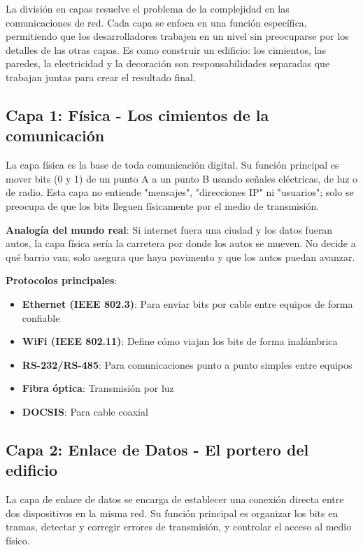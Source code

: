 La división en capas resuelve el problema de la complejidad en las comunicaciones de red. Cada capa se enfoca en una función específica, permitiendo que los desarrolladores trabajen en un nivel sin preocuparse por los detalles de las otras capas. Es como construir un edificio: los cimientos, las paredes, la electricidad y la decoración son responsabilidades separadas que trabajan juntas para crear el resultado final.

\subsection{Capa 1: Física - Los cimientos de la comunicación}

La capa física es la base de toda comunicación digital. Su función principal es mover bits (0 y 1) de un punto A a un punto B usando señales eléctricas, de luz o de radio. Esta capa no entiende "mensajes", "direcciones IP" ni "usuarios"; solo se preocupa de que los bits lleguen físicamente por el medio de transmisión.

\textbf{Analogía del mundo real}: Si internet fuera una ciudad y los datos fueran autos, la capa física sería la carretera por donde los autos se mueven. No decide a qué barrio van; solo asegura que haya pavimento y que los autos puedan avanzar.

\textbf{Protocolos principales}:
\begin{itemize}
    \item \textbf{Ethernet (IEEE 802.3)}: Para enviar bits por cable entre equipos de forma confiable
    \item \textbf{WiFi (IEEE 802.11)}: Define cómo viajan los bits de forma inalámbrica
    \item \textbf{RS-232/RS-485}: Para comunicaciones punto a punto simples entre equipos
    \item \textbf{Fibra óptica}: Transmisión por luz
    \item \textbf{DOCSIS}: Para cable coaxial
\end{itemize}

\subsection{Capa 2: Enlace de Datos - El portero del edificio}

La capa de enlace de datos se encarga de establecer una conexión directa entre dos dispositivos en la misma red. Su función principal es organizar los bits en tramas, detectar y corregir errores de transmisión, y controlar el acceso al medio físico.

